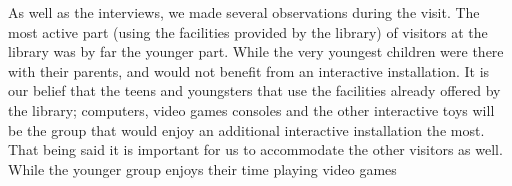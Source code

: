 As well as the interviews, we made several observations during the visit. The most active part (using the facilities provided by the library) of visitors at the library was by far the younger part. While the very youngest children were there with their parents, and would not benefit from an interactive installation. It is our belief that the teens and youngsters that use the facilities already offered by the library; computers, video games consoles and the other interactive toys  will be the group that would enjoy an additional interactive installation the most. That being said it is important for us to accommodate the other visitors as well.
\\
While the younger group enjoys their time playing video games 
